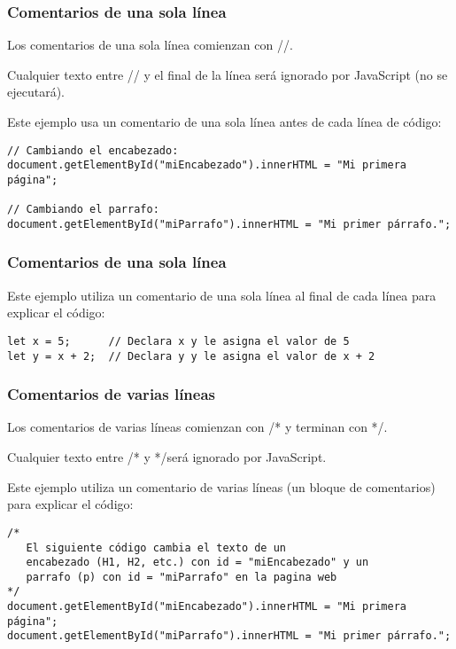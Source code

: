 \begin{frame}[fragile]
  \frametitle{Comentarios de una sola línea}

  Los comentarios de una sola línea comienzan con //.

  \vspace{\baselineskip}
  Cualquier texto entre // y el final de la línea será ignorado
  por JavaScript (no se ejecutará).

  \vspace{\baselineskip}
  Este ejemplo usa un comentario de una sola línea antes de
  cada línea de código:

  \vspace{\baselineskip}
  \begin{lstlisting}
// Cambiando el encabezado:
document.getElementById("miEncabezado").innerHTML = "Mi primera página";

// Cambiando el parrafo:
document.getElementById("miParrafo").innerHTML = "Mi primer párrafo.";
  \end{lstlisting}
\end{frame}

\begin{frame}[fragile]
  \frametitle{Comentarios de una sola línea}

  Este ejemplo utiliza un comentario de una sola línea al
  final de cada línea para explicar el código:

  \vspace{\baselineskip}
  \begin{lstlisting}
let x = 5;      // Declara x y le asigna el valor de 5
let y = x + 2;  // Declara y y le asigna el valor de x + 2
  \end{lstlisting}
\end{frame}

\begin{frame}[fragile]
  \frametitle{Comentarios de varias líneas}

  Los comentarios de varias líneas comienzan con /* y
  terminan con */.

  \vspace{\baselineskip}
  Cualquier texto entre /* y */será ignorado por JavaScript.

  \vspace{\baselineskip}
  Este ejemplo utiliza un comentario de varias líneas
  (un bloque de comentarios) para explicar el código:

  \vspace{\baselineskip}
  \begin{lstlisting}
/*
   El siguiente código cambia el texto de un
   encabezado (H1, H2, etc.) con id = "miEncabezado" y un
   parrafo (p) con id = "miParrafo" en la pagina web
*/
document.getElementById("miEncabezado").innerHTML = "Mi primera página";
document.getElementById("miParrafo").innerHTML = "Mi primer párrafo.";
  \end{lstlisting}
\end{frame}

